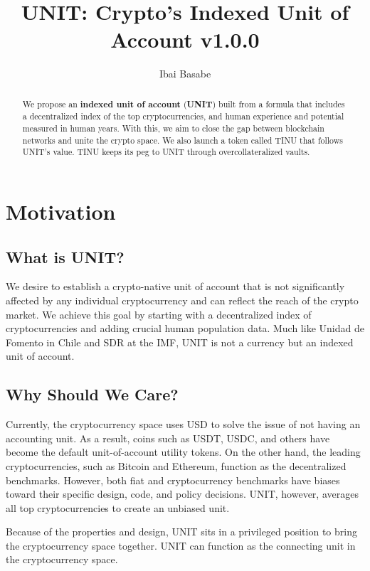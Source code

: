 \documentclass[12pt]{article}
\title{UNIT: Crypto's Indexed Unit of Account v1.0.0}
\author{Ibai Basabe}
\begin{document}
\date{}

\maketitle


\begin{abstract}
We propose an {\bf indexed unit of account} ({\bf UNIT}) built from a formula that includes a decentralized index of the top cryptocurrencies, and human experience and potential measured in human years. With this, we aim to close the gap between blockchain networks and unite the crypto space. We also launch a token called TINU that follows UNIT's value. TINU keeps its peg to UNIT through overcollateralized vaults. 
\end{abstract}


\tableofcontents
\newpage

\section{Motivation}

\subsection{What is UNIT?}

We desire to establish a crypto-native unit of account that is not significantly affected by any individual cryptocurrency and can reflect the reach of the crypto market. We achieve this goal by starting with a decentralized index of cryptocurrencies and adding crucial human population data. Much like Unidad de Fomento in Chile and SDR at the IMF, UNIT is not a currency but an indexed unit of account.

\subsection{Why Should We Care?}

Currently, the cryptocurrency space uses USD to solve the issue of not having an accounting unit. As a result, coins such as USDT, USDC, and others have become the default unit-of-account utility tokens. On the other hand, the leading cryptocurrencies, such as Bitcoin and Ethereum, function as the decentralized benchmarks. However, both fiat and cryptocurrency benchmarks have biases toward their specific design, code, and policy decisions. UNIT, however, averages all top cryptocurrencies to create an unbiased unit.

Because of the properties and design, UNIT sits in a privileged position to bring the cryptocurrency space together. UNIT can function as the connecting unit in the cryptocurrency space.
\end{document}
